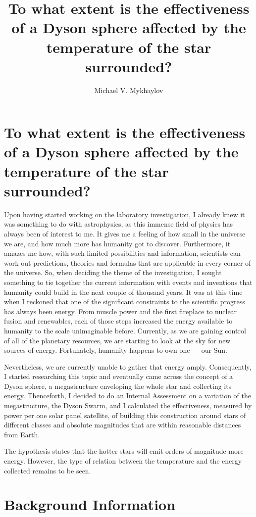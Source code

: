 \documentclass[stu, 11pt, a4paper, floatsintext, noextraspace]{apa7}
\title{To what extent is the effectiveness of a Dyson sphere affected by the temperature of the star surrounded?}
\author{Michael V. Mykhaylov}
\begin{document}
	\section{To what extent is the effectiveness of a Dyson sphere affected by the temperature of the star surrounded?}
	Upon having started working on the laboratory investigation, I already knew it was something to do with astrophysics, as this immense field of physics has always been of interest to me. It gives me a feeling of how small in the universe we are, and how much more has humanity got to discover. Furthermore, it amazes me how, with such limited possibilities and information, scientists can work out predictions, theories and formulas that are applicable in every corner of the universe. So, when deciding the theme of the investigation, I sought something to tie together the current information with events and inventions that humanity could build in the next couple of thousand years. It was at this time when I reckoned that one of the significant constraints to the scientific progress has always been energy. From muscle power and the first fireplace to nuclear fusion and renewables, each of those steps increased the energy available to humanity to the scale unimaginable before. Currently, as we are gaining control of all of the planetary resources, we are starting to look at the sky for new sources of energy. Fortunately, humanity happens to own one — our Sun. 
	
	Nevertheless, we are currently unable to gather that energy amply. Consequently, I started researching this topic and eventually came across the concept of a Dyson sphere, a megastructure enveloping the whole star and collecting its energy. Thenceforth, I decided to do an Internal Assessment on a variation of the megastructure, the Dyson Swarm, and I calculated the effectiveness, measured by power per one solar panel satellite, of building this construction around stars of different classes and absolute magnitudes that are within reasonable distances from Earth.

	The hypothesis states that the hotter stars will emit orders of magnitude more energy. However, the type of relation between the temperature and the energy collected remains to be seen.
	\section{Background Information}
\end{document}
